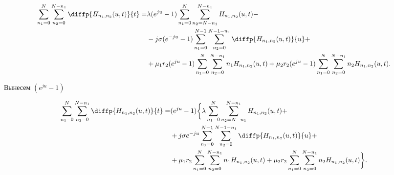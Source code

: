\begin{equation*}
	\begin{aligned}
		\sum_{n_1=0}^N\sum_{n_2=0}^{N-n_1} \diffp{H_{n_1,n_2}(u,t)}{t}=
		&\lambda (e^{ju} - 1)\sum_{n_1=0}^N\sum_{n_2=N-n_1}^{N-n_1} 
		H_{n_1, n_2}(u,t)-\\
		&- j \sigma(e^{-ju}-1)\sum_{n_1=0}^{N-1}\sum_{n_2=0}^{N-1-n_1} 
		\diffp{H_{n_1, n_2}(u,t)}{u}+\\
		&+\mu_1 r_2 (e^{ju} -1)\sum_{n_1=0}^{N}\sum_{n_2=0}^{N-n_1} 
		n_1 H_{n_1, n_2}(u,t)
		+\mu_2 r_2 (e^{ju} -1)\sum_{n_1=0}^{N}\sum_{n_2=0}^{N-n_1} 
		n_2 H_{n_1, n_2}(u,t).\\
	\end{aligned}
\end{equation*}

Вынесем $(e^{ju} - 1)$

\begin{equation*}
	\begin{aligned}
		\sum_{n_1=0}^N\sum_{n_2=0}^{N-n_1} \diffp{H_{n_1,n_2}(u,t)}{t}=
		&(e^{ju} - 1)\bigg\{\lambda \sum_{n_1=0}^N\sum_{n_2=N-n_1}^{N-n_1} 
		H_{n_1, n_2}(u,t)+\\
		&+ j \sigma e^{-ju}\sum_{n_1=0}^{N-1}\sum_{n_2=0}^{N-1-n_1} 
		\diffp{H_{n_1, n_2}(u,t)}{u}+\\
		&+\mu_1 r_2 \sum_{n_1=0}^{N}\sum_{n_2=0}^{N-n_1} 
		n_1 H_{n_1, n_2}(u,t)
		+\mu_2 r_2 \sum_{n_1=0}^{N}\sum_{n_2=0}^{N-n_1} 
		n_2 H_{n_1, n_2}(u,t)\bigg\}.\\
	\end{aligned}
\end{equation*}
